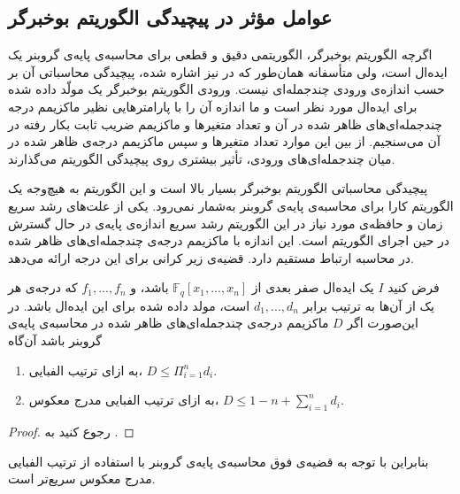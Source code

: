 \subsection*{عوامل مؤثر در پیچیدگی الگوریتم بوخبرگر}
اگرچه الگوریتم بوخبرگر، الگوریتمی دقیق و قطعی برای محاسبه‌ی پایه‌ی گروبنر یک ایده‌ال است، ولی متأسفانه  همان‌طور که در 
{\small \cite[ص.۵۱۱]{weispfenning1993groebner}}
نیز اشاره شده، پیچیدگی محاسباتی آن بر حسب اندازه‌ی ورودی چندجمله‌ای نیست. ورودی الگوریتم بوخبرگر یک مولّد داده شده برای ایده‌ال مورد نظر است و ما اندازه آن را با پارامترهایی نظیر ماکزیمم درجه چندجمله‌ای‌های ظاهر شده در آن و تعداد متغیر‌ها و ماکزیمم ضریب ثابت بکار رفته در آن می‌سنجیم. از بین این موارد تعداد متغیر‌ها و سپس ماکزیمم درجه‌ی ظاهر شده در میان چندجمله‌ای‌های ورودی، تأثیر بیشتری روی پیچیدگی الگوریتم می‌گذارند. 


پیچیدگی محاسباتی الگوریتم بوخبرگر بسیار بالا است و این الگوریتم به هیچ‌وجه یک الگوریتم کارا برای محاسبه‌ی پایه‌ی گروبنر به‌شمار نمی‌رود. یکی از علت‌های  رشد سریع  زمان  و حافظه‌ی مورد نیاز در این الگوریتم رشد سریع اندازه‌ی پایه‌ی در حال گسترش در حین اجرای الگوریتم است. این اندازه با ماکزیمم درجه‌ی چند‌جمله‌ای‌های ظاهر شده در محاسبه ارتباط مستقیم دارد. قضیه‌ی زیر کرانی برای این درجه ارائه می‌دهد.

\begin{theorem}
فرض کنید 
$I$
یک ایده‌ال صفر بعدی از 
$\mathbb{F}_{q}[x_{1},...,x_{n}]$
باشد، و 
$f_{1},...,f_{n}$
که درجه‌ی هر یک از آن‌ها به ترتیب برابر 
$d_{1},...,d_{n}$
است، مولد داده شده برای این ایده‌ال باشد. در این‌صورت اگر 
$D$
ماکزیمم درجه‌ی چندجمله‌ای‌های ظاهر شده در محاسبه‌ی پایه‌ی گروبنر باشد آن‌گاه
\begin{enumerate}
\item
به ازای ترتیب الفبایی، 
$D\leq \Pi_{i = 1}^{n}d_{i}$.
\item
به ازای ترتیب الفبایی مدرج معکوس،
$D\leq 1 - n + \sum_{i = 1}^{n}d_{i}$.
\end{enumerate}
\end{theorem}
\begin{proof}
رجوع کنید به 
{\small \cite{faugere2004comparison}}.
\end{proof}
بنابراین با توجه به قضیه‌ی فوق  محاسبه‌ی پایه‌ی گروبنر با استفاده از ترتیب الفبایی مدرج معکوس سریع‌تر است. 

